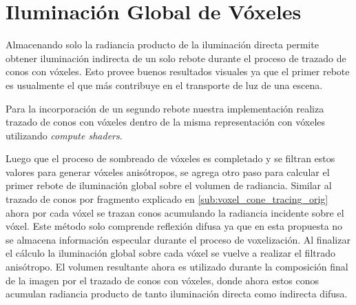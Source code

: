 \section{Iluminación Global de Vóxeles} %
\label{sec:iluminacion_global_de_voxeles}
Almacenando solo la radiancia producto de la iluminación directa permite obtener iluminación indirecta de un solo rebote durante el proceso de trazado de conos con vóxeles. Esto provee buenos resultados visuales ya que el primer rebote es usualmente el que más contribuye en el transporte de luz de una escena.

Para la incorporación de un segundo rebote nuestra implementación realiza trazado de conos con vóxeles dentro de la misma representación con vóxeles utilizando \emph{compute shaders}. 

Luego que el proceso de sombreado de vóxeles es completado y se filtran estos valores para generar vóxeles anisótropos, se agrega otro paso para calcular el primer rebote de iluminación global sobre el volumen de radiancia. Similar al trazado de conos por fragmento explicado en \ref{sub:voxel_cone_tracing_orig} ahora por cada vóxel se trazan conos acumulando la radiancia incidente sobre el vóxel. Este método solo comprende reflexión difusa ya que en esta propuesta no se almacena información especular durante el proceso de voxelización. Al finalizar el cálculo la iluminación global sobre cada vóxel se vuelve a realizar el filtrado anisótropo. El volumen resultante ahora es utilizado durante la composición final de la imagen por el trazado de conos con vóxeles, donde ahora estos conos acumulan radiancia producto de tanto iluminación directa como indirecta difusa.

